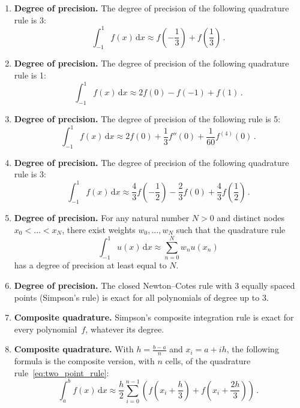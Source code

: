 \documentclass[a4paper]{article}
\renewcommand{\d}{\mathrm d}
\begin{document}
\begin{enumerate}

    \item
        \textbf{Degree of precision.}
        The degree of precision of the following quadrature rule is 3:
        \begin{equation}
            \label{eq:two_point_rule}
            \int_{-1}^{1} f(x) \, \d x \approx f\left(-\frac{1}{3}\right) + f\left(\frac{1}{3}\right)\,.
        \end{equation}

    \item
        \textbf{Degree of precision.}
        The degree of precision of the following quadrature rule is 1:
        \[
            \int_{-1}^{1} f(x) \, \d x \approx 2 f(0) - f(-1) + f(1)\,.
        \]

    \item
        \textbf{Degree of precision.}
        The degree of precision of the following rule is 5:
        \[
            \int_{-1}^1 f(x) \, \d x \approx 2f(0) + \frac{1}{3} f''(0) + \frac{1}{60} f^{(4)}(0)\,.
        \]

    \item
        \textbf{Degree of precision.}
        The degree of precision of the following quadrature rule is 3:
        \[
            \int_{-1}^{1} f(x) \, \d x \approx \frac{4}{3} f\left(-\frac{1}{2}\right) - \frac{2}{3} f(0) + \frac{4}{3} f\left(\frac{1}{2}\right)\,.
        \]

    \item
        \textbf{Degree of precision.}
        For any natural number $N > 0$ and distinct nodes $x_0 < \dotsc < x_N$,
        there exist weights $w_0, \dotsc, w_N$ such that the quadrature rule
        \[
            \int_{-1}^{1} u(x) \, \d x \approx \sum_{n=0}^{N} w_n u(x_n)
        \]
        has a degree of precision at least equal to $N$.

    \item
        \textbf{Degree of precision.}
        The closed Newton--Cotes rule with 3 equally spaced points (Simpson's rule) is exact for all polynomials of degree up to 3.

    \item
        \textbf{Composite quadrature.}
        Simpson's composite integration rule is exact for every polynomial~$f$, whatever its degree.

    \item
        \textbf{Composite quadrature.}
        With $h = \frac{b-a}{n}$ and $x_i = a + ih$, the following formula is the composite version, with $n$ cells, of the quadrature rule~\eqref{eq:two_point_rule}:
        \begin{equation}
            \label{eq:composite_two_point}
            \int_a^b f(x) \, \d x \approx \frac{h}{2} \sum_{i=0}^{n-1} \left( f\left(x_i + \frac{h}{3}\right) + f\left(x_i + \frac{2h}{3}\right) \right)\,.
        \end{equation}


\end{enumerate}
\end{document}
